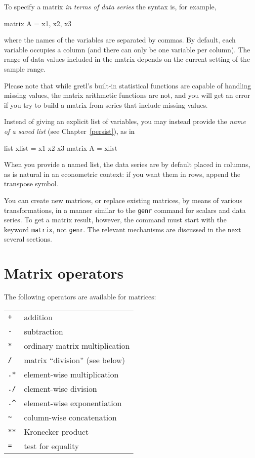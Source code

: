 To specify a matrix \textit{in terms of data series} the syntax is,
for example,
%
\begin{code}
matrix A = { x1, x2, x3 }
\end{code}
%
where the names of the variables are separated by commas.  By default,
each variable occupies a column (and there can only be one variable
per column).  The range of data values included in the matrix depends
on the current setting of the sample range.

Please note that while gretl's built-in statistical functions are
capable of handling missing values, the matrix arithmetic functions
are not, and you will get an error if you try to build a matrix from
series that include missing values.

Instead of giving an explicit list of variables, you may instead
provide the \textit{name of a saved list} (see Chapter~\ref{persist}),
as in
%
\begin{code}
list xlist = x1 x2 x3
matrix A = { xlist }
\end{code}
%
When you provide a named list, the data series are by default placed
in columns, as is natural in an econometric context: if you want them
in rows, append the transpose symbol.

You can create new matrices, or replace existing matrices, by means of
various transformations, in a manner similar to the \texttt{genr}
command for scalars and data series.  To get a matrix result, however,
the command must start with the keyword \texttt{matrix}, not
\texttt{genr}.  The relevant mechanisms are discussed in the next
several sections.


\section{Matrix operators}
\label{matrix-op}

The following operators are available for matrices:

\begin{center}
\begin{tabular}{ll}
\texttt{+} & addition \\
\texttt{-} & subtraction \\
\texttt{*} & ordinary matrix multiplication \\
\texttt{/} & matrix ``division'' (see below) \\
\texttt{.*} & element-wise multiplication \\
\texttt{./} & element-wise division \\
\verb+.^+ & element-wise exponentiation \\
\verb+~+ & column-wise concatenation \\
\texttt{**} & Kronecker product \\
\texttt{=} & test for equality 
\end{tabular}
\end{center}

